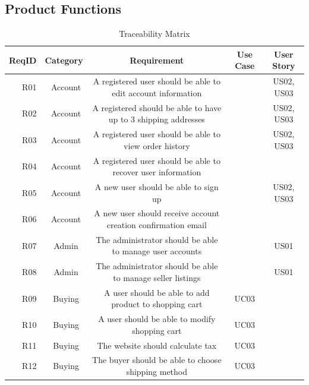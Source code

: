 \documentclass[11pt]{article}
\newcounter{use case ID}
\begin{document}
\subsection{Product Functions}
\begin{table}[H]
        \caption{Traceability Matrix}
        \begin{adjustbox}{width=\columnwidth,center}
            \begin{tabular}{|r | c| c | c| c|}
                \hline
                ReqID & Category & Requirement & Use Case & User Story \\
                \hline
                R01 & \ Account & A registered user should be able to edit account information & & US02, US03 \\
                    \hline
                R02 & \ Account & A registered should be able to have up to 3 shipping addresses &  & US02, US03 \\ 
                    \hline
                R03 & \ Account & A registered user should be able to view order history &  & US02, US03 \\ 
                \hline
                R04 & \ Account & A registered user should be able to recover user information & &  \\
                \hline
                R05 & \ Account & A new user should be able to sign up & & US02, US03  \\
                \hline
                R06 & \ Account & A new user should receive account creation confirmation email & &  \\
                \hline
                R07 & \ Admin & The administrator should be able to manage user accounts & & US01  \\
                \hline
                R08 & \ Admin & The administrator should be able to manage seller listings &  & US01 \\ 
                \hline
                R09 & \ Buying & A user should be able to add product to shopping cart & UC03 &  \\
                \hline
                R10 & \ Buying & A user should be able to modify shopping cart & UC03 &  \\
                \hline
                R11 & \ Buying & The website should calculate tax & UC03 &  \\
                \hline
                R12 & \ Buying & The buyer should be able to choose shipping method & UC03 &  \\
                \hline

\end{tabular}
\end{adjustbox}
\end{table}
\end{document}

